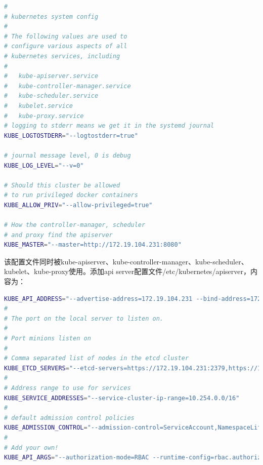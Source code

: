\documentclass[8pt]{book}
\numberwithin{dummy}{section}
\theoremstyle{ocrenumbox}
\theoremstyle{blacknumex}
\theoremstyle{blacknumbox}
\theoremstyle{ocrenum}
\newlength\esp
\begin{document}
\begin{lstlisting}[language=Bash]
#
# kubernetes system config
#
# The following values are used to 
# configure various aspects of all
# kubernetes services, including
#
#   kube-apiserver.service
#   kube-controller-manager.service
#   kube-scheduler.service
#   kubelet.service
#   kube-proxy.service
# logging to stderr means we get it in the systemd journal
KUBE_LOGTOSTDERR="--logtostderr=true"

# journal message level, 0 is debug
KUBE_LOG_LEVEL="--v=0"

# Should this cluster be allowed 
# to run privileged docker containers
KUBE_ALLOW_PRIV="--allow-privileged=true"

# How the controller-manager, scheduler
# and proxy find the apiserver
KUBE_MASTER="--master=http://172.19.104.231:8080"
\end{lstlisting}

该配置文件同时被kube-apiserver、kube-controller-manager、kube-scheduler、kubelet、kube-proxy使用。添加api server配置文件/etc/kubernetes/apiserver，内容为：

\begin{lstlisting}[language=Bash]
KUBE_API_ADDRESS="--advertise-address=172.19.104.231 --bind-address=172.19.104.231 --insecure-bind-address=172.19.104.231"
#
# The port on the local server to listen on.
#
# Port minions listen on
#
# Comma separated list of nodes in the etcd cluster
KUBE_ETCD_SERVERS="--etcd-servers=https://172.19.104.231:2379,https://172.19.104.230:2379,https://172.19.150.82:2379"
#
# Address range to use for services
KUBE_SERVICE_ADDRESSES="--service-cluster-ip-range=10.254.0.0/16"
#
# default admission control policies
KUBE_ADMISSION_CONTROL="--admission-control=ServiceAccount,NamespaceLifecycle,NamespaceExists,LimitRanger,ResourceQuota"
#
# Add your own!
KUBE_API_ARGS="--authorization-mode=RBAC --runtime-config=rbac.authorization.k8s.io/v1beta1 --kubelet-https=true --enable-bootstrap-token-auth --token-auth-file=/etc/kubernetes/token.csv --service-node-port-range=30000-32767 --tls-cert-file=/etc/kubernetes/ssl/kubernetes.pem --tls-private-key-file=/etc/kubernetes/ssl/kubernetes-key.pem --client-ca-file=/etc/kubernetes/ssl/ca.pem --service-account-key-file=/etc/kubernetes/ssl/ca-key.pem --etcd-cafile=/etc/kubernetes/ssl/ca.pem --etcd-certfile=/etc/kubernetes/ssl/kubernetes.pem --etcd-keyfile=/etc/kubernetes/ssl/kubernetes-key.pem --enable-swagger-ui=true --apiserver-count=3 --audit-log-maxage=30 --audit-log-maxbackup=3 --audit-log-maxsize=100 --audit-log-path=/var/lib/audit.log --event-ttl=1h"
\end{lstlisting}
\end{document}
